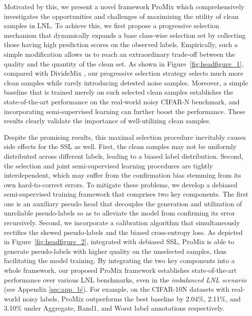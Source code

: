 \documentclass{article}
\begin{document}
Motivated by this, we present a novel framework ProMix which comprehensively investigates the opportunities and challenges of maximizing the utility of clean samples in LNL. To achieve this, we first propose a progressive selection mechanism that dynamically expands a base class-wise selection set by collecting those having high prediction scores on the observed labels. Empirically, such a simple modification allows us to reach an extraordinary trade-off between the quality and the quantity of the clean set. As shown in Figure~\ref{fig:headfigure_1}, compared with DivideMix \cite{DBLP:conf/iclr/LiSH20}, our progressive selection strategy selects much more clean samples while rarely introducing detested noise samples. Moreover, a simple baseline that is trained merely on such selected clean samples establishes the state-of-the-art performance on the real-world noisy CIFAR-N \cite{DBLP:conf/iclr/WeiZ0L0022} benchmark, and incorporating semi-supervised learning can further boost the performance. These results clearly validate the importance of well-utilizing clean samples. 

Despite the promising results, this maximal selection procedure inevitably causes side effects for the SSL as well. First, the clean samples may not be uniformly distributed across different labels, leading to a biased label distribution. Second, the selection and joint semi-supervised learning procedures are tightly interdependent, which may suffer from the confirmation bias stemming from its own hard-to-correct errors. To mitigate these problems, we develop a debiased semi-supervised training framework that comprises two key components. The first one is an auxiliary pseudo head that decouples the generation and utilization of unreliable pseudo-labels so as to alleviate the model from confirming its error recursively. Second, we incorporate a calibration algorithm that simultaneously rectifies the skewed pseudo-labels and the biased cross-entropy loss. As depicted in Figure~\ref{fig:headfigure_2}, integrated with debiased SSL, ProMix is able to generate pseudo-labels with higher quality on the unselected samples, thus facilitating the model training. By integrating the two key components into a whole framework, our proposed ProMix framework establishes state-of-the-art performance over various LNL benchmarks, even in the \emph{imbalanced LNL scenario} (see Appendix \ref{sec:app_b}). For example, on the CIFAR-10N datasets with real-world noisy labels, ProMix outperforms the best baseline by 2.04\%, 2.11\%, and 3.10\% under Aggregate, Rand1, and Worst label annotations respectively.
\end{document}
